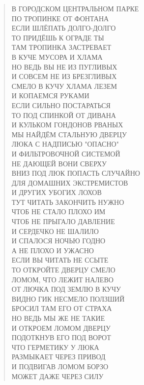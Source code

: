 \poemtitle{***}
\begin{verse}
В ГОРОДСКОМ ЦЕНТРАЛЬНОМ ПАРКЕ \\
ПО ТРОПИНКЕ ОТ ФОНТАНА\\
ЕСЛИ ШЛЁПАТЬ ДОЛГО-ДОЛГО\\
ТО ПРИДЁШЬ К ОГРАДЕ ТЫ\\
ТАМ ТРОПИНКА ЗАСТРЕВАЕТ\\
В КУЧЕ МУСОРА И ХЛАМА\\
НО ВЕДЬ ВЫ НЕ ИЗ ПУГЛИВЫХ\\
И СОВСЕМ НЕ ИЗ БРЕЗГЛИВЫХ\\
СМЕЛО В КУЧУ ХЛАМА ЛЕЗЕМ\\
И КОПАЕМСЯ РУКАМИ\\
ЕСЛИ СИЛЬНО ПОСТАРАТЬСЯ\\
ТО ПОД СПИНКОЙ ОТ ДИВАНА\\
И КУЛЬКОМ ГОНДОНОВ РВАНЫХ\\
МЫ НАЙДЁМ СТАЛЬНУЮ ДВЕРЦУ\\
ЛЮКА С НАДПИСЬЮ "ОПАСНО"\\
И ФИЛЬТРОВОЧНОЙ СИСТЕМОЙ\\
НЕ ДАЮЩЕЙ ВОНИ СВЕРХУ\\
ВНИЗ ПОД ЛЮК ПОПАСТЬ СЛУЧАЙНО\\
ДЛЯ ДОМАШНИХ ЭКСТРЕМИСТОВ\\
И ДРУГИХ УБОГИХ ЛОХОВ\\
ТУТ ЧИТАТЬ ЗАКОНЧИТЬ НУЖНО\\
ЧТОБ НЕ СТАЛО ПЛОХО ИМ\\
ЧТОБ НЕ ПРЫГАЛО ДАВЛЕНИЕ\\
И СЕРДЕЧКО НЕ ШАЛИЛО\\
И СПАЛОСЯ НОЧЬЮ ГОДНО\\
А НЕ ПЛОХО И УЖАСНО\\
ЕСЛИ ВЫ ЧИТАТЬ НЕ ССЫТЕ\\
ТО ОТКРОЙТЕ ДВЕРЦУ СМЕЛО\\
ЛОМОМ, ЧТО ЛЕЖИТ НАЛЕВО\\
ОТ ЛЮЧКА ПОД ЗЕМЛЮ В КУЧУ\\
ВИДНО ГИК НЕСМЕЛО ПОЛЗШИЙ\\
БРОСИЛ ТАМ ЕГО ОТ СТРАХА\\
НО ВЕДЬ МЫ ЖЕ НЕ ТАКИЕ\\
И ОТКРОЕМ ЛОМОМ ДВЕРЦУ\\
ПОДОТКНУВ ЕГО ПОД ВОРОТ\\
ЧТО ГЕРМЕТИКУ У ЛЮКА\\
РАЗМЫКАЕТ ЧЕРЕЗ ПРИВОД\\
И ПОДВИГАВ ЛОМОМ БОРЗО\\
МОЖЕТ ДАЖЕ ЧЕРЕЗ СИЛУ\\

\end{verse}
